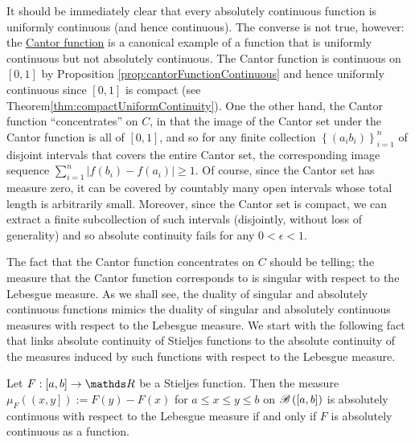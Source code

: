 It should be immediately clear that every absolutely continuous function
is uniformly continuous (and hence continuous). The converse is not
true, however: the \hyperref[def:cantorFunction]{Cantor function}
is a canonical example of a function that is uniformly continuous
but not absolutely continuous. The Cantor function is continuous on
$\left[0,1\right]$ by Proposition \ref{prop:cantorFunctionContinuous}
and hence uniformly continuous since $\left[0,1\right]$ is compact
(see Theorem\ref{thm:compactUniformContinuity}). One the other hand,
the Cantor function ``concentrates'' on $C$, in that the image
of the Cantor set under the Cantor function is all of $\left[0,1\right]$,
and so for any finite collection $\left\{ \left(a_{i}b_{i}\right)\right\} _{i=1}^{n}$
of disjoint intervals that covers the entire Cantor set, the corresponding
image sequence $\sum_{i=1}^{n}\lvert f\left(b_{i}\right)-f\left(a_{i}\right)\rvert\geq1.$
Of course, since the Cantor set has measure zero, it can be covered
by countably many open intervals whose total length is arbitrarily
small. Moreover, since the Cantor set is compact, we can extract a
finite subcollection of such intervals (disjointly, without loss of
generality) and so absolute continuity fails for any $0<\epsilon<1$.

The fact that the Cantor function concentrates on $C$ should be telling;
the measure that the Cantor function corresponds to is singular with
respect to the Lebesgue measure. As we shall see, the duality of singular
and absolutely continuous functions mimics the duality of singular
and absolutely continuous measures with respect to the Lebesgue measure.
We start with the following fact that links absolute continuity of
Stieljes functions to the absolute continuity of the measures induced
by such functions with respect to the Lebesgue measure.
\begin{prop}
\label{prop:absoluteContinuityStieljesFunctions}Let $F:\left[a,b\right]\to\R$
be a Stieljes function. Then the measure $\mu_{F}\left(\left(x,y\right]\right):=F\left(y\right)-F\left(x\right)$
for $a\leq x\leq y\leq b$ on $\mathscr{B}\left(\left[a,b\right]\right)$
is absolutely continuous with respect to the Lebesgue measure if and
only if $F$ is absolutely continuous as a function.
\end{prop}

